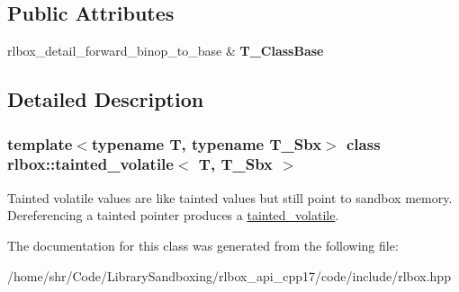 \subsection*{Public Attributes}
\begin{DoxyCompactItemize}
\item 
\mbox{\label{classrlbox_1_1tainted__volatile_a41f8c034554f4dff986b2209bdc45b4e}} 
rlbox\+\_\+detail\+\_\+forward\+\_\+binop\+\_\+to\+\_\+base \& {\bfseries T\+\_\+\+Class\+Base}
\end{DoxyCompactItemize}


\subsection{Detailed Description}
\subsubsection*{template$<$typename T, typename T\+\_\+\+Sbx$>$\newline
class rlbox\+::tainted\+\_\+volatile$<$ T, T\+\_\+\+Sbx $>$}

Tainted volatile values are like tainted values but still point to sandbox memory. Dereferencing a tainted pointer produces a \hyperlink{classrlbox_1_1tainted__volatile}{tainted\+\_\+volatile}. 

The documentation for this class was generated from the following file\+:\begin{DoxyCompactItemize}
\item 
/home/shr/\+Code/\+Library\+Sandboxing/rlbox\+\_\+api\+\_\+cpp17/code/include/rlbox.\+hpp\end{DoxyCompactItemize}
